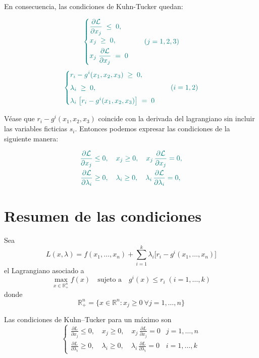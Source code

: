 \documentclass{article}
\begin{document}
En consecuencia, las condiciones de Kuhn-Tucker quedan:

\[\color{teal}
\begin{cases}
\displaystyle \frac{\partial\mathcal L}{\partial x_j}\;\le\;0,\\[4pt]
x_j\;\ge\;0,\\[4pt]
x_j\;\displaystyle\frac{\partial\mathcal L}{\partial x_j}\;=\;0
\end{cases}
\quad(j=1,2,3)
\]
\[\color{teal}
\begin{cases}
\displaystyle r_i - g^i(x_1,x_2,x_3)\;\ge\;0,\\[4pt]
\lambda_i\;\ge\;0,\\[4pt]
\lambda_i\;\bigl[r_i - g^i(x_1,x_2,x_3)\bigr]\;=\;0
\end{cases}
\quad(i=1,2)
\]



Véase que $r_i - g^i(x_1,x_2,x_3) $ coincide con la derivada del lagrangiano sin incluir las variables ficticias $s_i.$ 
Entonces podemos expresar las condiciones de la siguiente manera:

\[ \color{teal}
\begin{aligned}
\frac{\partial\mathcal L}{\partial x_j}&\le0,\quad x_j\ge0,\quad x_j\,\frac{\partial\mathcal L}{\partial x_j}=0,\\
\frac{\partial\mathcal L}{\partial \lambda_i}&\ge0,\quad \lambda_i\ge0,\quad \lambda_i\,\frac{\partial\mathcal L}{\partial \lambda_i}=0,
\end{aligned}
\]
\section*{Resumen de las condiciones}

Sea  
\[
L(x,\lambda)
= f(x_1,\dots,x_n)
+ \sum_{i=1}^{k}\lambda_i\bigl[r_i - g^i(x_1,\dots,x_n)\bigr]
\]
el Lagrangiano asociado a  
\[
\max_{x\in\mathbb R^n_+}f(x)
\quad\text{sujeto a}\quad
g^i(x)\le r_i\;(i=1,\dots,k)
\]
donde  
\[
\mathbb R^n_+ = \{x\in\mathbb R^n : x_j\ge0\ \forall j=1,\dots,n\}
\]

Las condiciones de Kuhn–Tucker para un máximo son  
\[
\begin{cases}
\displaystyle
\frac{\partial L}{\partial x_j}\le0,\quad
x_j\ge0,\quad
x_j\,\frac{\partial L}{\partial x_j}=0
& j=1,\dots,n\\[8pt]
\displaystyle
\frac{\partial L}{\partial \lambda_i}\ge0,\quad
\lambda_i\ge0,\quad
\lambda_i\,\frac{\partial L}{\partial \lambda_i}=0
& i=1,\dots,k
\end{cases}
\]
\end{document}
